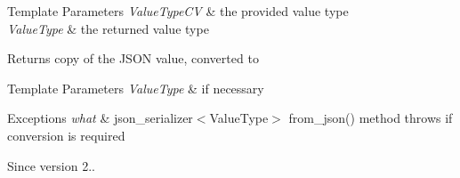 \begin{DoxyTemplParams}{Template Parameters}
{\em Value\+Type\+CV} & the provided value type \\
\hline
{\em Value\+Type} & the returned value type\\
\hline
\end{DoxyTemplParams}
\begin{DoxyReturn}{Returns}
copy of the J\+S\+ON value, converted to 
\end{DoxyReturn}

\begin{DoxyTemplParams}{Template Parameters}
{\em Value\+Type} & if necessary\\
\hline
\end{DoxyTemplParams}

\begin{DoxyExceptions}{Exceptions}
{\em what} & json\+\_\+serializer$<$\+Value\+Type$>$ {\ttfamily from\+\_\+json()} method throws if conversion is required\\
\hline
\end{DoxyExceptions}
\begin{DoxySince}{Since}
version 2.. 
\end{DoxySince}
\mbox{\label{classnlohmann_1_1basic__json_a46bb02ef17ee178984313efbc2c8eb8d}} 
